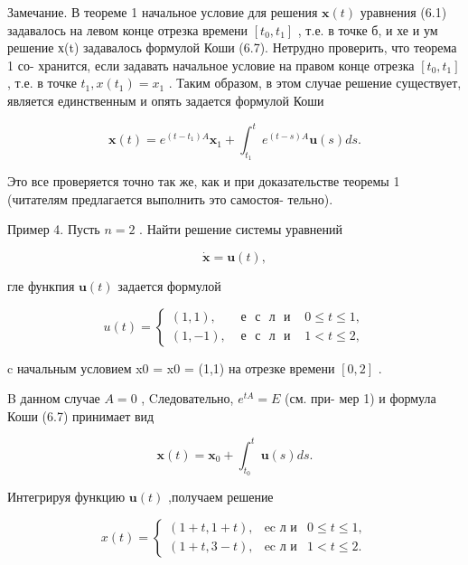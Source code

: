 \documentclass[8pt]{extarticle}
\begin{document}
Замечание. В теореме 1 начальное условие для решения \(\mathbf{x}\left( t\right)\) уравнения (6.1) задавалось на левом конце отрезка времени \(\left\lbrack  {{t}_{0},{t}_{1}}\right\rbrack\) , т.е. в точке б, и хе и ум решение х(t) задавалось формулой Коши (6.7). Нетрудно проверить, что теорема 1 со- хранится, если задавать начальное условие на правом конце отрезка \(\left\lbrack  {{t}_{0},{t}_{1}}\right\rbrack\) , т.е. в точке \({t}_{1},x\left( {t}_{1}\right)  = {x}_{1}\) . Таким образом, в этом случае решение существует, является единственным и опять задается формулой Коши

\[
\mathbf{x}\left( t\right)  = {e}^{\left( {t - {t}_{1}}\right) A}{\mathbf{x}}_{1} + {\int }_{{t}_{1}}^{t}{e}^{\left( {t - s}\right) A}\mathbf{u}\left( s\right) {ds}. \tag{6.9}
\]

Это все проверяется точно так же, как и при доказательстве теоремы 1 (читателям предлагается выполнить это самостоя- тельно).

Пример 4. Пусть \(n = 2\) . Найти решение системы уравнений

\[
\dot{\mathbf{x}} = \mathbf{u}\left( t\right) ,
\]

гле функпия \(\mathbf{u}\left( t\right)\) задается формулой

\[
u\left( t\right)  = \left\{  \begin{array}{lll} \left( {1,1}\right) , & \mathrm{{\text{ е }\text{ с }\text{ л }\text{ и }}} & 0 \leq  t \leq  1, \\  \left( {1, - 1}\right) , & \mathrm{{\text{ е }\text{ с }\text{ л }\text{ и }}} & 1 < t \leq  2, \end{array}\right.
\]

c начальным условием x0 = x0 = (1,1) на отрезке времени \(\left\lbrack  {0,2}\right\rbrack\) .

B данном случае \(A = 0\) , Cледовательно, \({e}^{tA} = E\) (см. при- мер 1) и формула Коши (6.7) принимает вид

\[
\mathbf{x}\left( t\right)  = {\mathbf{x}}_{0} + {\int }_{{t}_{0}}^{t}\mathbf{u}\left( s\right) {ds}.
\]

Интегрируя функцию \(\mathbf{u}\left( t\right)\) ,получаем решение

\[
x\left( t\right)  = \left\{  \begin{array}{lll} \left( {1 + t,1 + t}\right) , & \operatorname{ec\text{ л }\text{ и }} & 0 \leq  t \leq  1, \\  \left( {1 + t,3 - t}\right) , & \operatorname{ec\text{ л }\text{ и }} & 1 < t \leq  2. \end{array}\right.
\]
\end{document}
